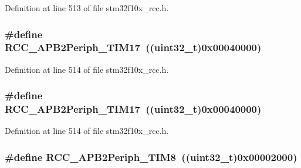 Definition at line 513 of file stm32f10x\+\_\+rcc.\+h.

\subsubsection[{\texorpdfstring{R\+C\+C\+\_\+\+A\+P\+B2\+Periph\+\_\+\+T\+I\+M17}{RCC_APB2Periph_TIM17}}]{\setlength{\rightskip}{0pt plus 5cm}\#define R\+C\+C\+\_\+\+A\+P\+B2\+Periph\+\_\+\+T\+I\+M17~(({\bf uint32\+\_\+t})0x00040000)}\hypertarget{group___a_p_b2__peripheral_ga5a6217b6200d6679dc7bee4522d6038a}{}\label{group___a_p_b2__peripheral_ga5a6217b6200d6679dc7bee4522d6038a}


Definition at line 514 of file stm32f10x\+\_\+rcc.\+h.

\subsubsection[{\texorpdfstring{R\+C\+C\+\_\+\+A\+P\+B2\+Periph\+\_\+\+T\+I\+M17}{RCC_APB2Periph_TIM17}}]{\setlength{\rightskip}{0pt plus 5cm}\#define R\+C\+C\+\_\+\+A\+P\+B2\+Periph\+\_\+\+T\+I\+M17~(({\bf uint32\+\_\+t})0x00040000)}\hypertarget{group___a_p_b2__peripheral_ga5a6217b6200d6679dc7bee4522d6038a}{}\label{group___a_p_b2__peripheral_ga5a6217b6200d6679dc7bee4522d6038a}


Definition at line 514 of file stm32f10x\+\_\+rcc.\+h.

\subsubsection[{\texorpdfstring{R\+C\+C\+\_\+\+A\+P\+B2\+Periph\+\_\+\+T\+I\+M8}{RCC_APB2Periph_TIM8}}]{\setlength{\rightskip}{0pt plus 5cm}\#define R\+C\+C\+\_\+\+A\+P\+B2\+Periph\+\_\+\+T\+I\+M8~(({\bf uint32\+\_\+t})0x00002000)}\hypertarget{group___a_p_b2__peripheral_gac951d41a08140a7d38a4faff8dd1e03e}{}\label{group___a_p_b2__peripheral_gac951d41a08140a7d38a4faff8dd1e03e}


